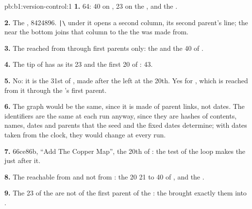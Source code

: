 \begin{solution}{pb:b1:version-control:1}
\textbf{1.} 64: 40  on , 23 on the , and the .

\textbf{2.} The , 8424896. \texttt{|\textbackslash} under it opens a second column, its second parent's line; the
\code{|/} near the bottom joins that column to the  the  was made from.

\textbf{3.} The  reached from  through first parents only: the  and the 40  of .

\textbf{4.} The tip of  has as  its 23  and the first 20  of : 43.

\textbf{5.} No: it is the 31st  of , made after the  left at the 20th. Yes for , which
is reached from it through the 's first parent.

\textbf{6.} The graph would be the same, since it is made of parent links, not dates. The identifiers are the same at
each run anyway, since they are hashes of contents, names, dates and parents that the seed and the fixed dates
determine; with dates taken from the clock, they would change at every run.

\textbf{7.} 66ce86b, ``Add The Copper Map'', the 20th  of : the test
 of the loop makes the  just after it.

\textbf{8.} The  reachable from  and not from : the 20  21 to 40 of ,
and the .

\textbf{9.} The 23  of the  are not  of the first parent of the : the  brought exactly
them into .


\end{solution}
